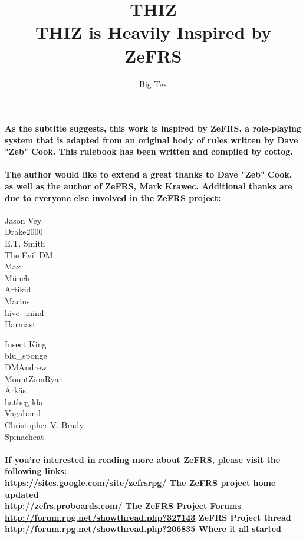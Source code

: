 \documentclass[oneside]{book}
\begin{document}
\frontmatter

\title{ {\Huge THIZ} \\ \vspace{2 mm} {\large THIZ is Heavily Inspired by ZeFRS}}
\date{}
\author{Big Tex}
\maketitle

\paragraph{As the subtitle suggests, this work is inspired by ZeFRS, a role-playing system that is adapted from an original body of rules written by Dave "Zeb" Cook. This rulebook has been written and compiled by cottog.} 

\paragraph{The author would like to extend a great thanks to Dave "Zeb" Cook, as well as the author of ZeFRS, Mark Krawec. Additional thanks are due to everyone else involved in the ZeFRS project: \\}

\begin{minipage}[t]{0.5\textwidth}
Jason Vey \\
Drake2000 \\ 
E.T. Smith \\
The Evil DM \\
Max \\
M\"{u}nch \\
Artikid \\
Marius \\
hive\_mind \\
Harmast
\end{minipage}
\begin{minipage}[t]{0.5\textwidth}
Insect King \\
blu\_sponge \\
DMAndrew \\
MountZionRyan \\
\"{A}rk\"{a}s \\
hatheg-kla \\
Vagabond \\
Christopher V. Brady \\
Spinachcat
\end{minipage}

\paragraph{If you're interested in reading more about ZeFRS, please visit the following links: \\
\url{https://sites.google.com/site/zefrsrpg/} The ZeFRS project home \textbf{updated}\\
\url{http://zefrs.proboards.com/} The ZeFRS Project Forums \\
\url{http://forum.rpg.net/showthread.php?327143} ZeFRS Project thread \\
\url{http://forum.rpg.net/showthread.php?206835} Where it all started }
\end{document}
